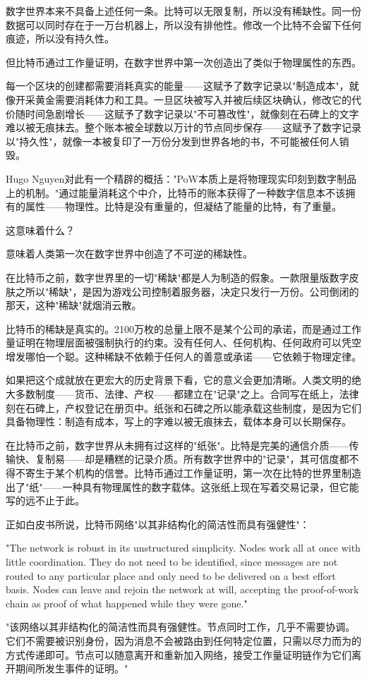 \documentclass[a4paper,12pt,openany]{ctexbook}
\newenvironment{quoting}{%
  \par\vspace{0.5em}%
  \begin{list}{}{%
    \setlength{\leftmargin}{2em}%
    \setlength{\rightmargin}{2em}%
    \setlength{\parsep}{0.3em}%
    \setlength{\itemsep}{0pt}%
    \setlength{\topsep}{0pt}%
  }%
  \item\relax
}{%
  \end{list}%
  \par\vspace{0.5em}%
}
\begin{document}
数字世界本来不具备上述任何一条。比特可以无限复制，所以没有稀缺性。同一份数据可以同时存在于一万台机器上，所以没有排他性。修改一个比特不会留下任何痕迹，所以没有持久性。

但比特币通过工作量证明，在数字世界中第一次创造出了类似于物理属性的东西。

每一个区块的创建都需要消耗真实的能量——这赋予了数字记录以"制造成本"，就像开采黄金需要消耗体力和工具。一旦区块被写入并被后续区块确认，修改它的代价随时间急剧增长——这赋予了数字记录以"不可篡改性"，就像刻在石碑上的文字难以被无痕抹去。整个账本被全球数以万计的节点同步保存——这赋予了数字记录以"持久性"，就像一本被复印了一万份分发到世界各地的书，不可能被任何人销毁。

Hugo Nguyen对此有一个精辟的概括："PoW本质上是将物理现实印刻到数字制品上的机制。"通过能量消耗这个中介，比特币的账本获得了一种数字信息本不该拥有的属性——物理性。比特是没有重量的，但凝结了能量的比特，有了重量。

这意味着什么？

意味着人类第一次在数字世界中创造了不可逆的稀缺性。

在比特币之前，数字世界里的一切"稀缺"都是人为制造的假象。一款限量版数字皮肤之所以"稀缺"，是因为游戏公司控制着服务器，决定只发行一万份。公司倒闭的那天，这种"稀缺"就烟消云散。

比特币的稀缺是真实的。2100万枚的总量上限不是某个公司的承诺，而是通过工作量证明在物理层面被强制执行的约束。没有任何人、任何机构、任何政府可以凭空增发哪怕一个聪。这种稀缺不依赖于任何人的善意或承诺——它依赖于物理定律。

如果把这个成就放在更宏大的历史背景下看，它的意义会更加清晰。人类文明的绝大多数制度——货币、法律、产权——都建立在"记录"之上。合同写在纸上，法律刻在石碑上，产权登记在册页中。纸张和石碑之所以能承载这些制度，是因为它们具备物理性：制造有成本，写上的字难以被无痕抹去，载体本身可以长期保存。

在比特币之前，数字世界从未拥有过这样的"纸张"。比特是完美的通信介质——传输快、复制易——却是糟糕的记录介质。所有数字世界中的"记录"，其可信度都不得不寄生于某个机构的信誉。比特币通过工作量证明，第一次在比特的世界里制造出了"纸"——一种具有物理属性的数字载体。这张纸上现在写着交易记录，但它能写的远不止于此。

正如白皮书所说，比特币网络"以其非结构化的简洁性而具有强健性"：


\begin{quoting}
\small
"The network is robust in its unstructured simplicity. Nodes work all at once with little coordination. They do not need to be identified, since messages are not routed to any particular place and only need to be delivered on a best effort basis. Nodes can leave and rejoin the network at will, accepting the proof-of-work chain as proof of what happened while they were gone."

"该网络以其非结构化的简洁性而具有强健性。节点同时工作，几乎不需要协调。它们不需要被识别身份，因为消息不会被路由到任何特定位置，只需以尽力而为的方式传递即可。节点可以随意离开和重新加入网络，接受工作量证明链作为它们离开期间所发生事件的证明。"
\end{quoting}
\end{document}
